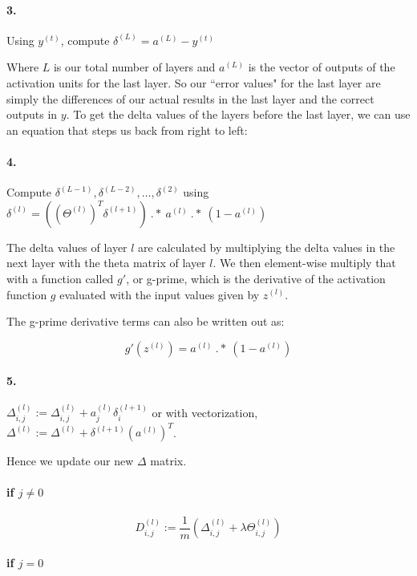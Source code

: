 \documentclass[UTF8]{article}
\begin{document}
\paragraph{3.} Using $y^{(t)}$, compute $\delta^{(L)} = a^{(L)} - y^{(t)}$

Where $L$ is our total number of layers and $a^{(L)}$ is the vector of outputs of the activation units for the last layer. So our ``error values" for the last layer are simply the differences of our actual results in the last layer and the correct outputs in $y$. To get the delta values of the layers before the last layer, we can use an equation that steps us back from right to left:

\paragraph{4.} Compute $\delta^{(L-1)}, \delta^{(L-2)},\dots,\delta^{(2)}$ using $\delta^{(l)} = ((\Theta^{(l)})^T \delta^{(l+1)})\ .*\ a^{(l)}\ .*\ (1 - a^{(l)})$

The delta values of layer $l$ are calculated by multiplying the delta values in the next layer with the theta matrix of layer $l$. We then element-wise multiply that with a function called $g'$, or g-prime, which is the derivative of the activation function $g$ evaluated with the input values given by $z^{(l)}$.

The g-prime derivative terms can also be written out as:

\[g'(z^{(l)}) = a^{(l)}\ .*\ (1 - a^{(l)})\]

\paragraph{5.} $\Delta^{(l)}_{i,j} := \Delta^{(l)}_{i,j} + a_j^{(l)} \delta_i^{(l+1)}$ or with vectorization, $\Delta^{(l)} := \Delta^{(l)} + \delta^{(l+1)}(a^{(l)})^T$.

Hence we update our new $\Delta$ matrix.

\paragraph{ if $j\ne0$ }

\[D^{(l)}_{i,j} := \dfrac{1}{m}\left(\Delta^{(l)}_{i,j} + \lambda\Theta^{(l)}_{i,j}\right)\]

\paragraph{ if $j = 0$ }
\end{document}
